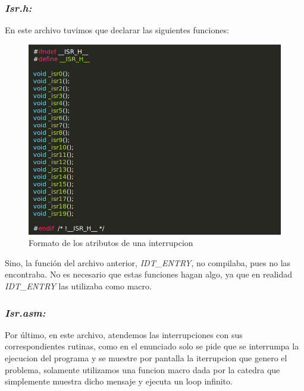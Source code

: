  \subsubsection{{\large \textit{Isr.h:}}}

 En este archivo tuvimos que declarar las siguientes funciones:
  \begin{figure}[H]
\begin{center}
  \includegraphics[width=\linewidth]{ejercicio2/isrh.png}
  \caption{{\small Formato de los atributos de una interrupcion} }
\endminipage
\end{center}
\end{figure}


 Sino, la función del archivo anterior, \textit{IDT\_ENTRY}, no compilaba, pues no las encontraba. No es necesario que estas funciones hagan algo, ya que en realidad \textit{IDT\_ENTRY} las utilizaba como macro.

 \subsubsection{{\large \textit{Isr.asm:}}}

Por último, en este archivo, atendemos las interrupciones con sus correspondientes rutinas, como en el enunciado solo se pide que se interrumpa la ejecucion del programa y se muestre por pantalla la iterrupcion que genero el problema, solamente utilizamos una funcion macro dada por la catedra que simplemente muestra dicho mensaje y ejecuta un loop infinito.\\

